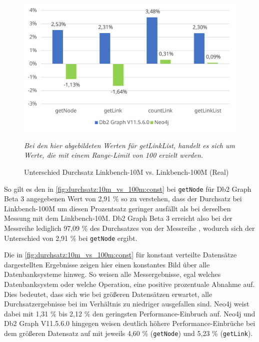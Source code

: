 \begin{figure}[!ht]
    \centering
    \includegraphics[width=\textwidth]{images/diagramme/difference_durchsatz_real_10m_vs_100m.pdf}
    \caption{Unterschied Durchsatz Linkbench-10M vs. Linkbench-100M (Real)}
    \label{fig:durchsatz:10m_vs_100m:real}
    \vspace{1em}
    \textit{Bei den hier abgebildeten Werten für getLinkList, handelt es sich um Werte, die mit einem Range-Limit von 100 erzielt werden.}
\end{figure}

So gilt es den in \autoref{fig:durchsatz:10m_vs_100m:const} bei \texttt{getNode} für Db2 Graph Beta 3 angegebenen Wert von 2,91 \% so zu verstehen, dass der Durchsatz bei Linkbench-100M um diesen Prozentsatz geringer ausfällt als bei derselben Messung mit dem Linkbench-10M. Db2 Graph Beta 3 erreicht also bei der Messreihe  lediglich 97,09 \% des Durchsatzes von der Messreihe , wodurch sich der Unterschied von 2,91 \% bei \texttt{getNode} ergibt.

Die in \autoref{fig:durchsatz:10m_vs_100m:const} für konstant verteilte Datensätze dargestellten Ergebnisse zeigen hier einen konstantes Bild über alle Datenbanksysteme hinweg. So weisen alle Messergebnisse, egal welches Datenbanksystem oder welche Operation, eine positive prozentuale Abnahme auf. Dies bedeutet, dass sich wie bei größeren Datensätzen erwartet, alle Durchsatzergebnisse bei  im Verhältnis zu  niedriger ausgefallen sind. Neo4j weist dabei mit 1,31 \% bis 2,12 \% den geringsten Performance-Einbruch auf. Neo4j und Db2 Graph V11.5.6.0 hingegen weisen deutlich höhere Performance-Einbrüche bei dem größeren Datensatz auf mit jeweils 4,60 \% (\texttt{getNode}) und 5,23 \% (\texttt{getLink}). 

